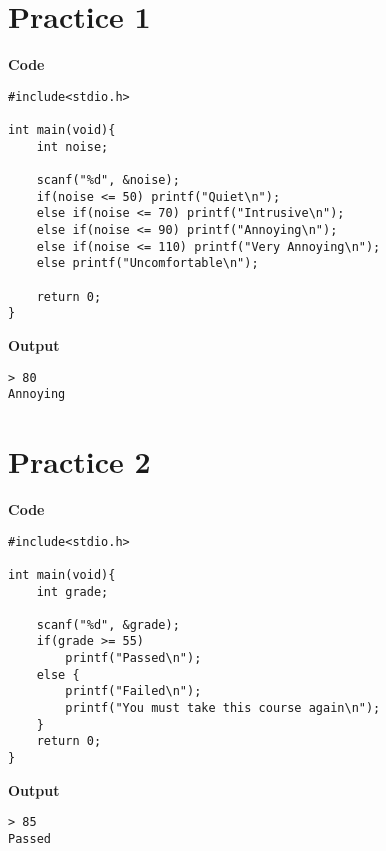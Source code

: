 \documentclass[a4paper, 10pt]{article}
\begin{document}
    \section*{Practice 1}
    \begin{minipage}[t]{0.55\textwidth}
        \large \textbf{Code}
        \begin{lstlisting}[style=code]
#include<stdio.h>

int main(void){
    int noise;

    scanf("%d", &noise);
    if(noise <= 50) printf("Quiet\n");
    else if(noise <= 70) printf("Intrusive\n");
    else if(noise <= 90) printf("Annoying\n");
    else if(noise <= 110) printf("Very Annoying\n");
    else printf("Uncomfortable\n");

    return 0;
}
        \end{lstlisting}
    \end{minipage}
    \hspace{0.5cm}
    \begin{minipage}[t]{0.4\textwidth}
        \large \textbf{Output}
        \begin{lstlisting}[style=output]
> 80
Annoying
        \end{lstlisting}
    \end{minipage} 

    \section*{Practice 2}
    \begin{minipage}[t]{0.55\textwidth}
        \large \textbf{Code}
        \begin{lstlisting}[style=code]
#include<stdio.h>

int main(void){
    int grade;

    scanf("%d", &grade);
    if(grade >= 55)
        printf("Passed\n");
    else {
        printf("Failed\n");
        printf("You must take this course again\n");
    }
    return 0;
}
        \end{lstlisting}
    \end{minipage}
    \hspace{0.5cm}
    \begin{minipage}[t]{0.4\textwidth}
        \large \textbf{Output}
        \begin{lstlisting}[style=output]
> 85
Passed
        \end{lstlisting}
    \end{minipage}
\end{document}
